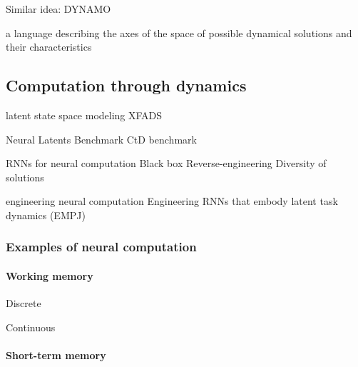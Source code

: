 \documentclass{article}
\theoremstyle{definition} \newtheorem{definition}{Definition}  \newtheorem{example}{Example}
\theoremstyle{remark} \newtheorem{remark}{Remark}
\newcounter{ct}
\begin{document}
Similar idea: DYNAMO \citep{cotler2023analyzing}

a language describing the axes of the space of possible dynamical solutions and their characteristics \citep{pagan2022dm}

\subsection{Computation through dynamics}
\citep{mante2013context}
\citep{sussillo2014neural}
\citep{vyas2020ctd}
\citep{versteeg2023expressive, sedler2023expressive}
\citep{dinc2025latentcomputing}

latent state space modeling \citep{zoltowski2020general} 
XFADS\citep{Dowling2024b}

Neural Latents Benchmark \citep{pei2neural}
CtD benchmark \citep{versteeg2025computation}

RNNs for neural computation \citep{chaisangmongkon2017transience}
Black box \citep{sussillo2013blackbox}
Reverse-engineering \citep{maheswaranathan2019reverse} \citep{golub2018fixedpointfinder} \citep{smith2021reverse} \citep{rivkind2017local}
Diversity of solutions \citep{maheswaranathan2019universality}\citep{jarne2023initialization} \citep{turner2021charting} \citep{nayebi2021heterogeneity} \citep{zhong2023mechanistic}

engineering neural computation \citep{eliasmith2003neuralengineering, eliasmith2005unified, eliasmith2010describe} \citep{beiran2023rnns}
Engineering RNNs that embody latent task dynamics (EMPJ) \citep{pollock2020engineering}


\subsubsection{Examples of neural computation}
\paragraph{Working memory}
Discrete 

Continuous \citep{hoeller2024bridging} \citep{zhang2022translation}

\paragraph{Short-term memory}
\citep{kurtkaya2025dynamical}
\end{document}
